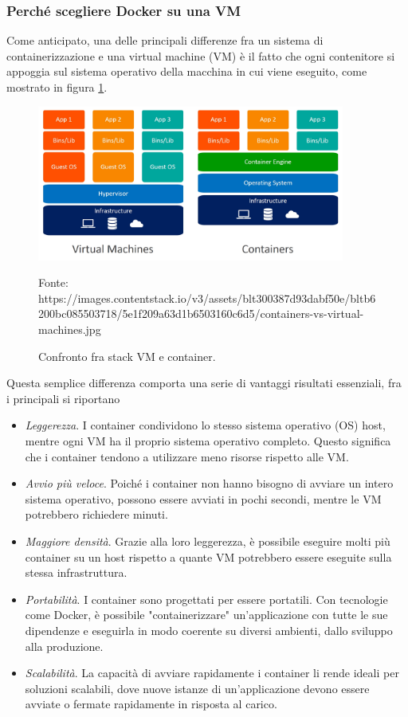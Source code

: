 \documentclass[12pt,a4paper,twoside,openright]{book}
\begin{document}
\subsubsection{Perché scegliere Docker su una VM}
Come anticipato, una delle principali differenze fra un sistema di containerizzazione e una virtual machine (VM) è il fatto che ogni contenitore si appoggia sul sistema operativo della macchina in cui viene eseguito, come mostrato in figura \ref{fig:docker-vm}. 

\begin{figure}
    \centering
    \includegraphics[width=0.9\textwidth]{images/container-vm.png}
    \caption{Confronto fra stack VM e container.}
    \label{fig:docker-vm}
    \tiny{Fonte: https://images.contentstack.io/v3/assets/blt300387d93dabf50e/bltb6200bc085503718/5e1f209a63d1b6503160c6d5/containers-vs-virtual-machines.jpg}
\end{figure}

Questa semplice differenza comporta una serie di vantaggi risultati essenziali, fra i principali si riportano

\begin{itemize}
    \item \emph{Leggerezza}. I container condividono lo stesso sistema operativo (OS) host, mentre ogni VM ha il proprio sistema operativo completo. Questo significa che i container tendono a utilizzare meno risorse rispetto alle VM.
    \item \emph{Avvio più veloce}. Poiché i container non hanno bisogno di avviare un intero sistema operativo, possono essere avviati in pochi secondi, mentre le VM potrebbero richiedere minuti.
    \item \emph{Maggiore densità}. Grazie alla loro leggerezza, è possibile eseguire molti più container su un host rispetto a quante VM potrebbero essere eseguite sulla stessa infrastruttura. 
    \item \emph{Portabilità}. I container sono progettati per essere portatili. Con tecnologie come Docker, è possibile "containerizzare" un'applicazione con tutte le sue dipendenze e eseguirla in modo coerente su diversi ambienti, dallo sviluppo alla produzione.
    \item \emph{Scalabilità}. La capacità di avviare rapidamente i container li rende ideali per soluzioni scalabili, dove nuove istanze di un'applicazione devono essere avviate o fermate rapidamente in risposta al carico.
\end{itemize}
\end{document}
